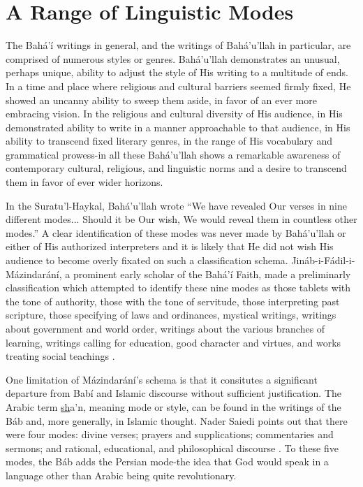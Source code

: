 \documentclass[12pt, oneside]{report}
\begin{document}
\section{A Range of Linguistic Modes}
\par  
The Bah\'{a}'\'{i} writings in general, and the writings of Bah\'{a}'u'llah in particular, are comprised of numerous styles or genres. Bah\'{a}'u'llah demonstrates an unusual, perhaps unique, ability to adjust the style of His writing to a multitude of ends. 
In a time and place where religious and cultural barriers seemed firmly fixed, He showed an uncanny ability to sweep them aside, in favor of an ever more embracing vision. 
In the religious and cultural diversity of His audience, in His demonstrated ability to write in a manner approachable to that audience, in His ability to transcend fixed literary genres, in the range of His vocabulary and grammatical prowess-in all these Bah\'{a}'u'llah shows a remarkable awareness of contemporary cultural, religious, and linguistic norms and a desire to transcend them in favor of ever wider horizons.
\par   
In the Suratu'l-Haykal, Bah\'{a}'u'llah wrote ``We have revealed Our verses in nine different modes... Should it be Our wish, We would reveal them in countless other modes.'' A clear identification of these modes was never made by Bah\'{a}'u'llah or either of His authorized interpreters and it is likely that He did not wish His audience to become overly fixated on such a classification schema. Jin\'{a}b-i-F\'{a}dil-i-M\'{a}zindar\'{a}n\'{i}, a prominent early scholar of the Bah\'{a}'\'{i} Faith, made a preliminarly classification which attempted to identify these nine modes as those tablets with the tone of authority, those with the tone of servitude, those interpreting past scripture, those specifying of laws and ordinances, mystical writings, writings about government and world order, writings about the various branches of learning, writings calling for education, good character and virtues, and works treating social teachings \cite{}.
\par 
One limitation of M\'{a}zindar\'{a}n\'{i}'s schema is that it consitutes a significant departure from Bab\'{i} and Islamic discourse without sufficient justification. The Arabic term \underline{sh}a'n, meaning mode or style, can be found in the writings of the B\'{a}b and, more generally, in Islamic thought. Nader Saiedi points out that there were four modes: divine verses; prayers and supplications; commentaries and sermons; and rational, educational, and philosophical discourse \cite{saiedi_gate_2008}. To these five modes, the B\'{a}b adds the Persian mode-the idea that God would speak in a language other than Arabic being quite revolutionary. 
\end{document}
